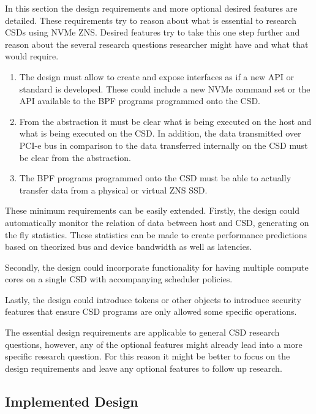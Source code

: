 \documentclass[conference]{IEEEtran}
\begin{document}
In this section the design requirements and more optional desired features are
detailed. These requirements try to reason about what is essential to research
CSDs using NVMe ZNS. Desired features try to take this one step further and
reason about the several research questions researcher might have and what that
would require.

\begin{enumerate}
\item The design must allow to create and expose interfaces as if a new API
or standard is developed. These could include a new NVMe command set or the
API available to the BPF programs programmed onto the CSD.

\item From the abstraction it must be clear what is being executed on the
host and what is being executed on the CSD. In addition, the data transmitted
over PCI-e bus in comparison to the data transferred internally on the CSD must
be clear from the abstraction.

\item The BPF programs programmed onto the CSD must be able to actually transfer
data from a physical or virtual ZNS SSD.
\end{enumerate}

These minimum requirements can be easily extended. Firstly, the design could
automatically monitor the relation of data between host and CSD, generating on
the fly statistics. These statistics can be made to create performance
predictions based on theorized bus and device bandwidth as well as latencies.

Secondly, the design could incorporate functionality for having multiple
compute cores on a single CSD with accompanying scheduler policies.

Lastly, the design could introduce tokens or other objects to introduce security
features that ensure CSD programs are only allowed some specific operations.

The essential design requirements are applicable to general CSD research
questions, however, any of the optional features might already lead into a more
specific research question. For this reason it might be better to focus on the
design requirements and leave any optional features to follow up research.

\subsection{Implemented Design}
\end{document}
